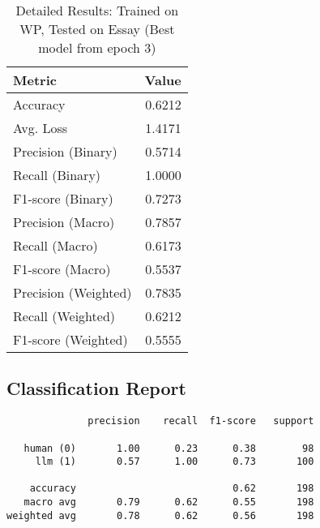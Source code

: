 \documentclass{article}
\begin{document}
\begin{table}[htbp]
\centering
\caption*{Detailed Results: Trained on WP, Tested on Essay (Best model from epoch 3)}
\begin{tabular}{@{}lr@{}}
\toprule
Metric & Value \\
\midrule
Accuracy & 0.6212 \\
Avg. Loss & 1.4171 \\
Precision (Binary) & 0.5714 \\
Recall (Binary) & 1.0000 \\
F1-score (Binary) & 0.7273 \\
Precision (Macro) & 0.7857 \\
Recall (Macro) & 0.6173 \\
F1-score (Macro) & 0.5537 \\
Precision (Weighted) & 0.7835 \\
Recall (Weighted) & 0.6212 \\
F1-score (Weighted) & 0.5555 \\
\bottomrule
\end{tabular}
\subsection*{Classification Report}
\begin{verbatim}
              precision    recall  f1-score   support

   human (0)       1.00      0.23      0.38        98
     llm (1)       0.57      1.00      0.73       100

    accuracy                           0.62       198
   macro avg       0.79      0.62      0.55       198
weighted avg       0.78      0.62      0.56       198
\end{verbatim}
\end{table}
\end{document}
